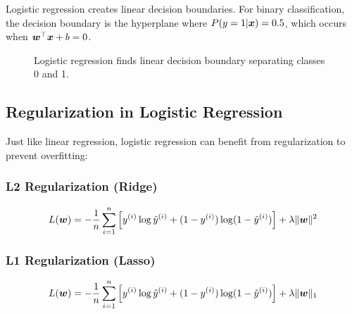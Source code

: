 Logistic regression creates linear decision boundaries. For binary classification, the decision boundary is the hyperplane where $P(y=1|\boldsymbol{x}) = 0.5$, which occurs when $\boldsymbol{w}^\top \boldsymbol{x} + b = 0$.

\begin{figure}[htbp]
\centering
{}
\caption{Logistic regression finds linear decision boundary separating classes 0 and 1.}
\label{fig:logistic-decision-boundary}
\end{figure}

\subsection{Regularization in Logistic Regression}

Just like linear regression, logistic regression can benefit from regularization to prevent overfitting:

\subsubsection{L2 Regularization (Ridge)}

\begin{equation}
L(\boldsymbol{w}) = -\frac{1}{n} \sum_{i=1}^{n} \left[y^{(i)} \log \hat{y}^{(i)} + (1-y^{(i)}) \log(1-\hat{y}^{(i)})\right] + \lambda \|\boldsymbol{w}\|^2
\end{equation}

\subsubsection{L1 Regularization (Lasso)}

\begin{equation}
L(\boldsymbol{w}) = -\frac{1}{n} \sum_{i=1}^{n} \left[y^{(i)} \log \hat{y}^{(i)} + (1-y^{(i)}) \log(1-\hat{y}^{(i)})\right] + \lambda \|\boldsymbol{w}\|_1
\end{equation}

